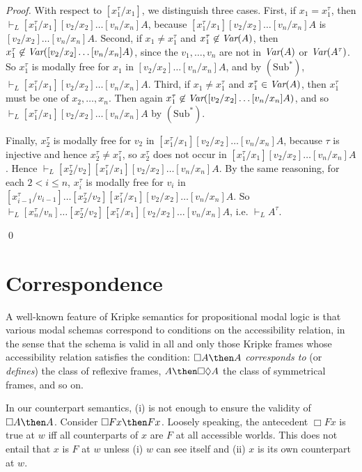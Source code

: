 \documentclass[11pt]{woarticle}
\newcommand{\cmnt}[1]{\iffalse #1 \fi}
\theoremstyle{break}
\theoremstyle{nonumberplain}
\newcommand{\1}{\;\,|\;\,}
\newcommand{\var}{\emph{Var}}
\newcommand{\T}[1]{\ensuremath{(\mathrm{ #1})}}
\begin{document}
\begin{proof}
{    With respect to $[x_1^\tau/x_1]$, we distinguish three cases. First,
    if $x_1 = x_1^\tau$, then $\vdash_L
    [x_1^\tau/x_1][v_2/x_2]\ldots[v_n/x_n]A$, because
    $[x_1^\tau/x_1][v_2/x_2]\ldots[v_n/x_n]A$ is
    $[v_2/x_2]\ldots[v_n/x_n]A$. Second, if $x_1 \not= x_1^\tau$ and
    $x_1^\tau \not\in \var(A)$, then $x_1^\tau \not\in
    \var([v_2/x_2]\ldots[v_n/x_n]A)$, since the $v_1,\ldots,v_n$ are not
    in $\var(A)$ or $\var(A^\tau)$\cmnt{ (in particular, thus no new
      variables are introduced in $[v_2/x_2]\ldots[v_n/x_n]A$)}. So
    $x_1^\tau$ is modally free for $x_1$ in $[v_2/x_2]\ldots[v_n/x_n]A$,
    and by \T{Sub^*}, $\vdash_L
    [x_1^\tau/x_1][v_2/x_2]\ldots[v_n/x_n]A$. Third, if $x_1 \not=
    x_1^\tau$ and $x_1^\tau \in \var(A)$, then $x_1^\tau$ must be one of
    $x_2,\ldots,x_n$. Then again $x_1^\tau \not\in
    \var([v_2/x_2]\ldots[v_n/x_n]A)$, and so $\vdash_L
    [x_1^\tau/x_1][v_2/x_2]\ldots[v_n/x_n]A$ by \T{Sub^*}.
    
    Finally, $x_2^\tau$ is modally free for $v_2$ in
    $[x_1^\tau/x_1][v_2/x_2]\ldots[v_n/x_n]A$, because $\tau$ is
    injective and hence $x_2^\tau \not= x_1^\tau$, so $x_2^\tau$ does
    not occur in $[x_1^\tau/x_1][v_2/x_2]\ldots[v_n/x_n]A$. Hence
    $\vdash_{L}
    [x_2^\tau/v_2][x_1^\tau/x_1][v_2/x_2]\ldots[v_n/x_n]A$. By the same
    reasoning, for each $2 < i \leq n$, $x_i^\tau$ is modally free for
    $v_i$ in
    $[x_{i-1}^\tau/v_{i-1}]\ldots[x_2^\tau/v_2][x_1^\tau/x_1][v_2/x_2]\ldots[v_n/x_n]A$.
    So $\vdash_{L}
    [x_{n}^\tau/v_{n}]\ldots[x_2^\tau/v_2][x_1^\tau/x_1][v_2/x_2]\ldots[v_n/x_n]A$,
    i.e. $\vdash_L A^\tau$.
  }%
  \qed

\end{proof}


\section{Correspondence}\label{sec:correspondence}

A well-known feature of Kripke semantics for propositional modal logic is that
various modal schemas correspond to conditions on the accessibility relation, in
the sense that the schema is valid in all and only those Kripke frames whose
accessibility relation satisfies the condition: $\Box A \then A$
\emph{corresponds to} (or \emph{defines}) the class of reflexive frames,
$A \then \Box\Diamond A$ the class of symmetrical frames, and so on.

In our counterpart semantics, (i) is not enough to ensure the validity of
$\Box A \then A$. Consider $\Box Fx \then Fx$. Loosely speaking, the antecedent
$\Box Fx$ is true at $w$ iff all counterparts of $x$ are $F$ at all accessible
worlds. This does not entail that $x$ is $F$ at $w$ unless (i) $w$ can see
itself and (ii) $x$ is its own counterpart at $w$.
\end{document}

